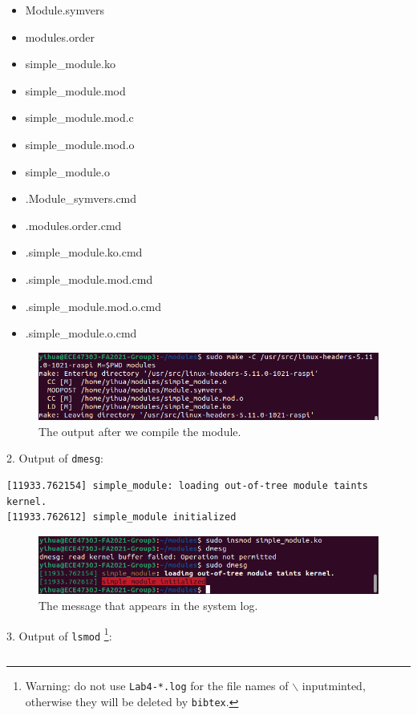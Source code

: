 \documentclass[a4paper]{article}
\begin{document}
\begin{itemize}
    \item Module.symvers
    \item modules.order
    \item simple\_module.ko
    \item simple\_module.mod
    \item simple\_module.mod.c
    \item simple\_module.mod.o
    \item simple\_module.o
    \item .Module\_symvers.cmd
    \item .modules.order.cmd
    \item .simple\_module.ko.cmd
    \item .simple\_module.mod.cmd
    \item .simple\_module.mod.o.cmd
    \item .simple\_module.o.cmd
\end{itemize}
\begin{figure}[H]
    \centering
    \includegraphics[width=1\textwidth]{1.png}
    \caption{The output after we compile the module.}
\end{figure}
2. Output of \texttt{dmesg}:
\begin{verbatim}
[11933.762154] simple_module: loading out-of-tree module taints kernel.
[11933.762612] simple_module initialized
\end{verbatim}
\begin{figure}[H]
    \centering
    \includegraphics[width=1\textwidth]{2.png}
    \caption{The message that appears in the system log.}
\end{figure}
3. Output of \texttt{lsmod} \footnote{Warning: do not use \texttt{Lab4-*.log} for the file names of $\backslash$ inputminted, otherwise they will be deleted by \texttt{bibtex}.}:
\inputminted[frame=single,bgcolor=bg,breaklines,breakanywhere,linenos]{text}{Lab4-3.txt}
\end{document}
